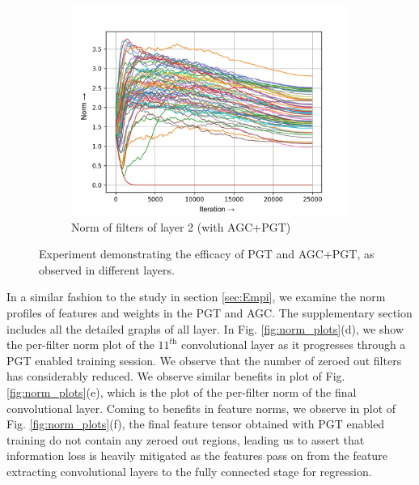 \documentclass[times,sort&compress]{elsarticle}
\begin{document}
\begin{figure}[t]
\begin{subfigure}[t]{0.33\textwidth}
\includegraphics[width=\textwidth]{agc_pgt-w-layer-1-2}
\caption{Norm of filters of layer 2 (with AGC+PGT)}
\end{subfigure}
\captionsetup{font=normalsize}
\caption{ Experiment demonstrating the efficacy of PGT and AGC+PGT, as observed in
different layers. }
\label{fig:agc_pgt}
\end{figure}





In a similar fashion to the study in section \ref{sec:Empi}, we examine the norm
profiles of features and weights in the PGT and AGC. The supplementary section includes
all the detailed graphs of all layer. In Fig. \ref{fig:norm_plots}(d), we show the
per-filter norm plot of the $11^\textit{th}$ convolutional layer as it progresses
through a PGT enabled training session. We observe that the number of zeroed out filters
has considerably reduced. We observe similar benefits in plot of Fig.
\ref{fig:norm_plots}(e), which is the plot of the per-filter norm of the final
convolutional layer. Coming to benefits in feature norms, we observe in plot of Fig.
\ref{fig:norm_plots}(f), the final feature tensor obtained with PGT enabled training do
not contain any zeroed out regions, leading us to assert that information loss is
heavily mitigated as the features pass on from the feature extracting convolutional
layers to the fully connected stage for regression.
\end{document}
